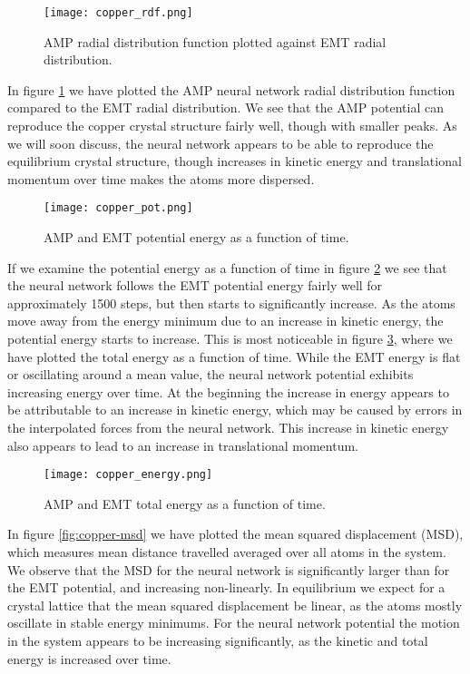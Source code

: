 \begin{figure}[H]
    \centering
    \texttt{[image: copper\_rdf.png]}
    \caption{AMP radial distribution function plotted against
        EMT radial distribution.}
    \label{fig:copper-rdf}
\end{figure}

In figure \ref{fig:copper-rdf} we have plotted the AMP neural network
radial distribution function compared to the EMT radial distribution.
We see that the AMP potential can reproduce the copper crystal
structure fairly well, though with smaller peaks.
As we will soon discuss, the neural network appears
to be able to reproduce the equilibrium crystal structure,
though increases in kinetic energy and translational momentum over time
makes the atoms more dispersed.

\begin{figure}[H]
    \centering
    \texttt{[image: copper\_pot.png]}
    \caption{AMP and EMT potential energy as a function of time.}
    \label{fig:copper-pot}
\end{figure}

If we examine the potential energy as a function of time
in figure \ref{fig:copper-pot} we see that the neural network
follows the EMT potential energy fairly well for approximately
1500 steps, but then starts to significantly increase.
As the atoms move away from the energy minimum due to an increase
in kinetic energy, the potential energy starts to increase.
This is most noticeable in figure \ref{fig:copper-energy},
where we have plotted the total energy as a function of time.
While the EMT energy is flat or oscillating around a mean value,
the neural network potential exhibits increasing energy over time.
At the beginning the increase in energy appears to be attributable
to an increase in kinetic energy, which may be caused by errors
in the interpolated forces from the neural network.
This increase in kinetic energy also appears to lead to an increase
in translational momentum.

\begin{figure}[H]
    \centering
    \texttt{[image: copper\_energy.png]}
    \caption{AMP and EMT total energy as a function of time.}
    \label{fig:copper-energy}
\end{figure}

In figure \ref{fig:copper-msd} we have plotted the mean squared
displacement (MSD), 
which measures mean distance travelled averaged over all atoms in the system.
We observe that the MSD for the neural network is significantly larger
than for the EMT potential, and increasing non-linearly.
In equilibrium we expect for a crystal lattice
that the mean squared displacement be linear, as the atoms
mostly oscillate in stable energy minimums.
For the neural network potential the motion in the system appears
to be increasing significantly, as the kinetic and total energy is increased
over time.

